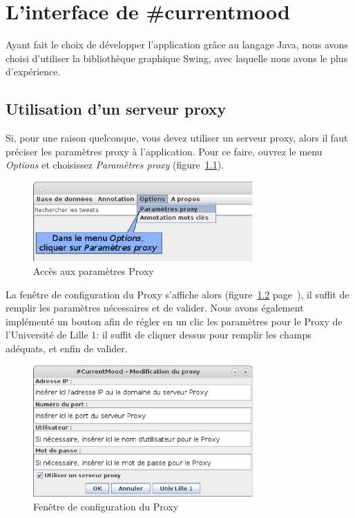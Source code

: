 \documentclass[12pt,a4paper]{report}
\newcommand{\CMName}{\#currentmood}
\begin{document}
\chapter{L'interface de \CMName}
Ayant fait le choix de développer l'application grâce au langage Java, nous
avons choisi d'utiliser la bibliothèque graphique Swing, avec laquelle nous
avons le plus d’expérience.

\section{Utilisation d'un serveur proxy}
Si, pour une raison quelconque, vous devez utiliser un serveur proxy, alors il
faut préciser les paramètres proxy à l'application. Pour ce faire, ouvrez le
menu \textit{Options} et choisissez \textit{Paramètres proxy}
(figure~\ref{capture_menuproxy}).

\begin{figure}
	\centering
	\includegraphics[width=0.75\textwidth]{img/capture_menuproxy.eps}
	\caption{Accès aux paramètres Proxy}
	\label{capture_menuproxy}
\end{figure}

La fenêtre de configuration du Proxy s'affiche alors
(figure~\ref{capture_fenproxy} page~\pageref{capture_fenproxy}), il suffit de
remplir les paramètres nécessaires et de valider. Nous avons également
implémenté un bouton afin de régler en un clic les paramètres pour le Proxy de
l'Université de Lille 1: il suffit de cliquer dessus pour remplir les champs
adéquats, et enfin de valider.

\begin{figure}
	\centering
	\includegraphics[width=0.75\textwidth]{img/capture_fenproxy.eps}
	\caption{Fenêtre de configuration du Proxy}
	\label{capture_fenproxy}
\end{figure}
\end{document}
